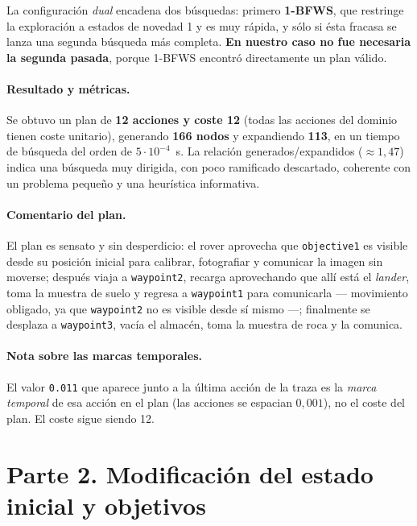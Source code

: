 \documentclass[12pt,a4paper]{article}
\begin{document}
La configuraci\'on \emph{dual} encadena dos b\'usquedas: primero
\textbf{1-BFWS}, que restringe la exploraci\'on a estados de novedad 1 y es
muy r\'apida, y s\'olo si \'esta fracasa se lanza una segunda b\'usqueda m\'as
completa. \textbf{En nuestro caso no fue necesaria la segunda pasada}, porque
1-BFWS encontr\'o directamente un plan v\'alido.

\paragraph{Resultado y m\'etricas.}
Se obtuvo un plan de \textbf{12 acciones y coste 12} (todas las acciones del
dominio tienen coste unitario), generando \textbf{166 nodos} y expandiendo
\textbf{113}, en un tiempo de b\'usqueda del orden de $5\cdot10^{-4}$~s. La
relaci\'on generados/expandidos ($\approx 1{,}47$) indica una b\'usqueda muy
dirigida, con poco ramificado descartado, coherente con un problema peque\~no
y una heur\'istica informativa.

\paragraph{Comentario del plan.}
El plan es sensato y sin desperdicio: el rover aprovecha que \texttt{objective1}
es visible desde su posici\'on inicial para calibrar, fotografiar y comunicar
la imagen sin moverse; despu\'es viaja a \texttt{waypoint2}, recarga
aprovechando que all\'i est\'a el \emph{lander}, toma la muestra de suelo y
regresa a \texttt{waypoint1} para comunicarla --- movimiento obligado, ya
que \texttt{waypoint2} no es visible desde s\'i mismo ---; finalmente se
desplaza a \texttt{waypoint3}, vac\'ia el almac\'en, toma la muestra de roca
y la comunica.

\paragraph{Nota sobre las marcas temporales.}
El valor \texttt{0.011} que aparece junto a la \'ultima acci\'on de la traza
es la \emph{marca temporal} de esa acci\'on en el plan (las acciones se
espacian $0{,}001$), no el coste del plan. El coste sigue siendo 12.

\section{Parte 2. Modificaci\'on del estado inicial y objetivos}
\end{document}
